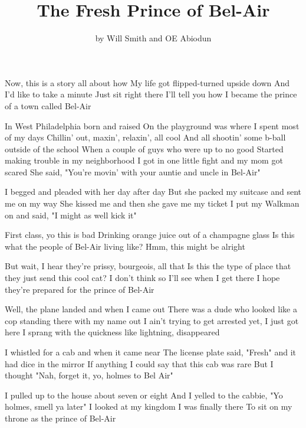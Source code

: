 \documentclass{article}
\title{The Fresh Prince of Bel-Air}
\author{by Will Smith and OE Abiodun}
\begin{document}
\maketitle

Now, this is a story all about how
My life got flipped-turned upside down
And I'd like to take a minute
Just sit right there
I'll tell you how I became the prince of a town called Bel-Air

In West Philadelphia born and raised
On the playground was where I spent most of my days
Chillin' out, maxin', relaxin', all cool
And all shootin' some b-ball outside of the school
When a couple of guys who were up to no good
Started making trouble in my neighborhood
I got in one little fight and my mom got scared
She said, "You're movin' with your auntie and uncle in Bel-Air"

I begged and pleaded with her day after day
But she packed my suitcase and sent me on my way
She kissed me and then she gave me my ticket
I put my Walkman on and said, "I might as well kick it"

First class, yo this is bad
Drinking orange juice out of a champagne glass
Is this what the people of Bel-Air living like?
Hmm, this might be alright

But wait, I hear they're prissy, bourgeois, all that
Is this the type of place that they just send this cool cat?
I don't think so
I'll see when I get there
I hope they're prepared for the prince of Bel-Air

Well, the plane landed and when I came out
There was a dude who looked like a cop standing there with my name out
I ain't trying to get arrested yet, I just got here
I sprang with the quickness like lightning, disappeared

I whistled for a cab and when it came near
The license plate said, "Fresh" and it had dice in the mirror
If anything I could say that this cab was rare
But I thought "Nah, forget it, yo, holmes to Bel Air"

I pulled up to the house about seven or eight
And I yelled to the cabbie, "Yo holmes, smell ya later"
I looked at my kingdom
I was finally there
To sit on my throne as the prince of Bel-Air
\end{document}
